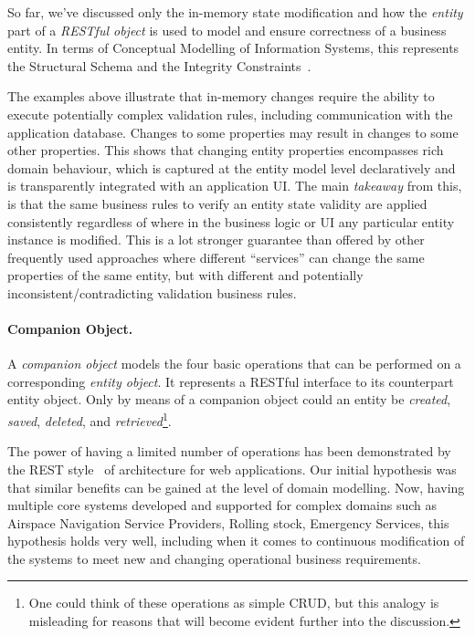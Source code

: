 \documentclass[a4paper,12pt,oneside,openright,final]{memoir} %
\begin{document}
	
	So far, we've discussed only the in-memory state modification and how the \emph{entity} part of a \emph{RESTful object} is used to model and ensure correctness of a business entity.
	In terms of Conceptual Modelling of Information Systems, this represents the Structural Schema and the Integrity Constraints~\cite{oli2007}.
	
	The examples above illustrate that in-memory changes require the ability to execute potentially complex validation rules, including communication with the application database.
	Changes to some properties may result in changes to some other properties.
	This shows that changing entity properties encompasses rich domain behaviour, which is captured at the entity model level declaratively and is transparently integrated with an application UI.
	The main \emph{takeaway} from this, is that the same business rules to verify an entity state validity are applied consistently regardless of where in the business logic or UI any particular entity instance is modified.
	This is a lot stronger guarantee than offered by other frequently used approaches where different ``services'' can change the same properties of the same entity, but with different and potentially inconsistent/contradicting validation business rules.
	
	\paragraph{Companion Object.}	
	A \emph{companion object} models the four basic operations that can be performed on a corresponding \emph{entity object}.
	It represents a RESTful interface to its counterpart entity object.
	Only by means of a companion object could an entity be \emph{created}, \emph{saved}, \emph{deleted}, and \emph{retrieved}\footnote{One could think of these operations as simple CRUD, but this analogy is misleading for reasons that will become evident further into the discussion.}.
	
	The power of having a limited number of operations has been demonstrated by the REST style~\cite{Fielding2000} of architecture for web applications.
	Our initial hypothesis was that similar benefits can be gained at the level of domain modelling.
	Now, having multiple core systems developed and supported for complex domains such as Airspace Navigation Service Providers, Rolling stock, Emergency Services, this hypothesis holds very well, including when it comes to continuous modification of the systems to meet new and changing operational business requirements.
  	
\end{document}
